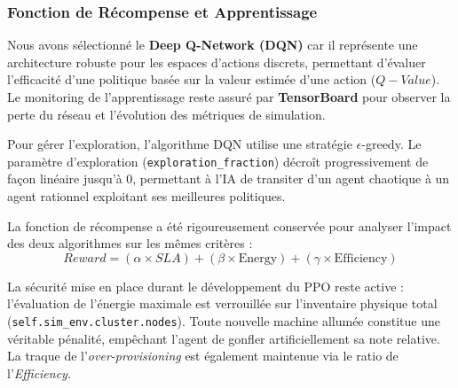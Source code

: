 \documentclass[11pt,a4paper]{article}
\begin{document}
\subsubsection{Fonction de Récompense et Apprentissage}
Nous avons sélectionné le \textbf{Deep Q-Network (DQN)} car il représente une architecture robuste pour les espaces d'actions discrets, permettant d'évaluer l'efficacité d'une politique basée sur la valeur estimée d'une action ($Q-Value$). Le monitoring de l'apprentissage reste assuré par \textbf{TensorBoard} pour observer la perte du réseau et l'évolution des métriques de simulation.

Pour gérer l'exploration, l'algorithme DQN utilise une stratégie $\epsilon$-greedy. Le paramètre d'exploration (\texttt{exploration\_fraction}) décroît progressivement de façon linéaire jusqu'à 0, permettant à l'IA de transiter d'un agent chaotique à un agent rationnel exploitant ses meilleures politiques.

La fonction de récompense a été rigoureusement conservée pour analyser l'impact des deux algorithmes sur les mêmes critères :
\begin{equation}
    Reward = (\alpha \times SLA) + (\beta \times \mathrm{Energy}) + (\gamma \times \mathrm{Efficiency})
\end{equation}

La sécurité mise en place durant le développement du PPO reste active : l'évaluation de l'énergie maximale est verrouillée sur l'inventaire physique total (\texttt{self.sim\_env.cluster.nodes}). Toute nouvelle machine allumée constitue une véritable pénalité, empêchant l'agent de gonfler artificiellement sa note relative. La traque de l'\textit{over-provisioning} est également maintenue via le ratio de l'\textit{Efficiency}.
\end{document}
